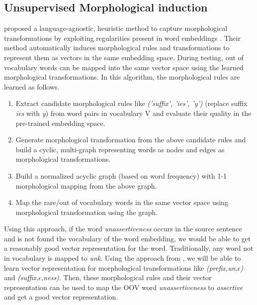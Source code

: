 \subsection{Unsupervised Morphological induction}

\cite{soricut2015unsupervised} proposed a language-agnostic, heuristic method to capture morphological transformations by exploiting regularities present in word embeddings \citep{mikolov2013distributed}. Their method automatically induces morphological rules and transformations to represent them as vectors in the same embedding space. During testing, out of vocabulary words can be mapped into the same vector space using the learned morphological transformations. In this algorithm, the morphological rules are learned as follows.

\begin{enumerate}
	\item Extract candidate morphological rules like \textit{('suffix', 'ies', 'y')} (replace suffix \textit{ies} with \textit{y}) from word pairs in vocabulary V and evaluate their quality in the pre-trained embedding space.
	\item Generate morphological transformation from the above candidate rules and build a cyclic, multi-graph representing words as nodes and edges as morphological transformations.
	\item Build a normalized acyclic graph (based on word frequency) with 1-1 morphological mapping from the above graph.
	\item Map the rare/out of vocabulary words in the same vector space using morphological transformation using the graph.
\end{enumerate}

Using this approach, if the word \textit{unassertiveness} occurs in the source sentence and is not found the vocabulary of the word embedding, we would be able to get a reasonably good vector representation for the word. Traditionally, any word not in vocabulary is mapped to \textit{unk}. Using the approach from  \cite{soricut2015unsupervised}, we will be able to learn vector representation for morphological transformations like \textit{(prefix,un,$\epsilon$)} and \textit{(suffix,$\epsilon$,ness)}. Then, these morphological rules and their vector representation can be used to map the OOV word \textit{unassertiveness} to  \textit{assertive} and get a good vector representation. 

